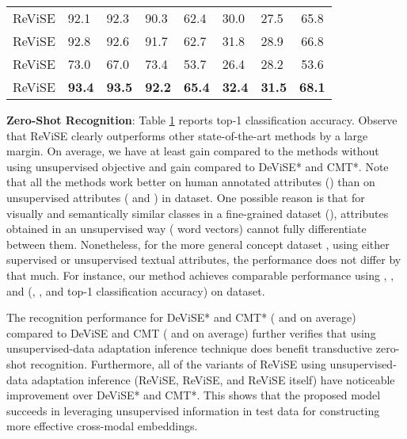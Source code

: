 {{\begin{table}[t!]
{\begin{tabular}{|c||lll||lll||c|}
ReViSE             &            92.1              &             92.3            &         90.3      &       62.4          &       30.0            &         27.5       &           65.8                 \\
ReViSE &              92.8            &              92.6           &           91.7               &     62.7           &      31.8             &      28.9          &       66.8                     \\
ReViSE             &            73.0              &             67.0            &         73.4      &       53.7          &       26.4            &         28.2       &           53.6                \\
ReViSE                &           {\bf 93.4}               &           {\bf 93.5}      &            {\bf 92.2}       &         {\bf 65.4}         & {\bf 32.4}        &           {\bf 31.5}        &      {\bf 68.1}                 \\ \hline
\end{tabular}
}
\label{tbl:zero_recog}
\vspace{-4mm}
\end{table}



\vspace{0.1in}
\hspace{-5mm} {\bf Zero-Shot Recognition}:
Table \ref{tbl:zero_recog} reports top-1 classification accuracy. Observe that ReViSE clearly outperforms other state-of-the-art methods by a large margin. On average, we have at least  gain compared to the methods without using unsupervised objective and  gain compared to DeViSE* and CMT*. Note that all the methods work better on human annotated attributes () than on unsupervised attributes ( and ) in  dataset. One possible reason is that for visually and semantically similar classes in a fine-grained dataset (), attributes obtained in an unsupervised way ( word vectors) cannot fully differentiate between them. 
Nonetheless, for the more general concept dataset , using either supervised or unsupervised textual attributes, the performance does not differ by that much. 
For instance, our method achieves comparable performance using , , and  (, , and  top-1 classification accuracy) on  dataset.


The recognition performance for DeViSE* and CMT* ( and  on average) compared to DeViSE and CMT ( and  on average) further verifies that using unsupervised-data adaptation inference technique does benefit transductive zero-shot recognition. 
Furthermore, all of the variants of ReViSE using unsupervised-data adaptation inference (ReViSE, ReViSE, and ReViSE itself) have noticeable improvement over DeViSE* and CMT*. 
This shows that the proposed model succeeds in leveraging unsupervised information in test data for constructing more effective cross-modal embeddings.

}}
